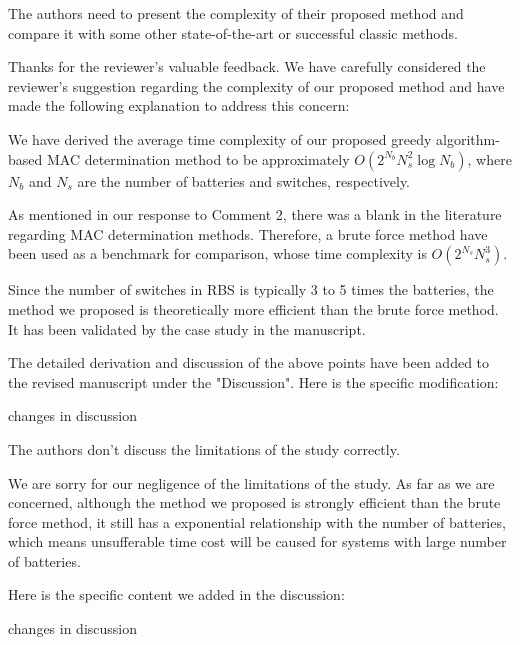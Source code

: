 \documentclass[12pt,american]{scrartcl}
\begin{document}
\begin{revcomment}
  The authors need to present the complexity of their proposed method and compare it with some other state-of-the-art or successful classic methods.
\end{revcomment}
\begin{revresponse}

Thanks for the reviewer's valuable feedback. We have carefully considered the reviewer's suggestion regarding the complexity of our proposed method and have made the following explanation to address this concern:


We have derived the average time complexity of our proposed greedy algorithm-based MAC determination method to be approximately $O(2^{N_b}N_s^2\log N_b)$, where $N_b$ and $N_s$ are the number of batteries and switches, respectively.


As mentioned in our response to Comment 2, there was a blank in the literature regarding MAC determination methods.
Therefore, a brute force method have been used as a benchmark for comparison, whose time complexity is $O(2^{N_s}N_s^3)$.


Since the number of switches in RBS is typically 3 to 5 times the batteries\cite{ciNovelDesignAdaptive2007,alahmadBatterySwitchArray2008,kimDependableEfficientScalable2010b,kimBalancedReconfigurationStorage2011a,taesickimSeriesconnectedSelfreconfigurableMulticell2012a,6843711}, the method we proposed is theoretically more efficient than the brute force method.
It has been validated by the case study in the manuscript.


The detailed derivation and discussion of the above points have been added to the revised manuscript under the "Discussion".
Here is the specific modification:
\begin{changes}
  changes in discussion
\end{changes}

\end{revresponse}

\begin{revcomment}
  The authors don't discuss the limitations of the study correctly.
\end{revcomment}
\begin{revresponse}

We are sorry for our negligence of the limitations of the study. As far as we are concerned, although the method we proposed is strongly efficient than the brute force method, it still has a exponential relationship with the number of batteries, which means unsufferable time cost will be caused for systems with large number of batteries.


Here is the specific content we added in the discussion:
\begin{changes}
  changes in discussion
\end{changes}

\end{revresponse}
\end{document}
